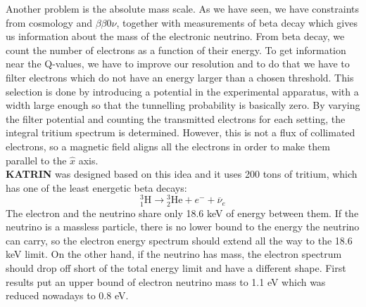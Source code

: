 \documentclass[10.75pt,a4paper,openright,bottom=2cm]{article}
\begin{document}
Another problem is the absolute mass scale. As we have seen, we have constraints from cosmology and $\beta\beta0\nu$, together with measurements of beta decay which gives us information about the mass of the electronic neutrino. From beta decay, we count the number of electrons as a function of their energy. To get information near the Q-values, we have to improve our resolution and to do that we have to filter electrons which do not have an energy larger than a chosen threshold. This selection is done by introducing a potential in the experimental apparatus, with a width large enough so that the tunnelling probability is basically zero. By varying the filter potential and counting the transmitted electrons for each setting, the integral tritium spectrum is determined. However, this is not a flux of collimated electrons, so a magnetic field aligns all the electrons in order to make them parallel to the $\hat{x}$ axis.\\ \textbf{KATRIN} was designed based on this idea and it uses 200 tons of tritium, which has one of the least energetic beta decays:
\[
\text{$^3_1$H}\to\text{$^3_2$He}+e^-+\overline{\nu}_e
\]
The electron and the neutrino share only 18.6 keV of energy between them.  If the neutrino is a massless particle, there is no lower bound to the energy the neutrino can carry, so the electron energy spectrum should extend all the way to the 18.6 keV limit. On the other hand, if the neutrino has mass, the electron spectrum should drop off short of the total energy limit and have a different shape. First results put an upper bound of electron neutrino mass to 1.1 eV which was reduced nowadays to 0.8 eV. 
\end{document}
